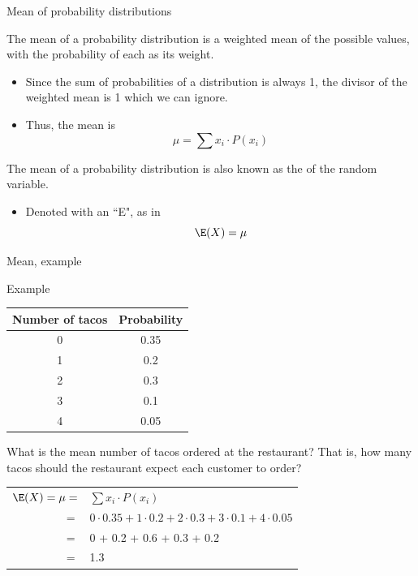 \documentclass[xcolor=table]{beamer}
\begin{document}
\begin{frame}{Mean of probability distributions}
\begin{block}{}
The mean of a probability distribution is a weighted mean of the possible values, with the probability of each as its weight. 
\begin{itemize}
\pause\item Since the sum of probabilities of a distribution is always 1, the divisor of the weighted mean is 1 which we can ignore.
\pause\item Thus, the mean is
\[\mu = \sum x_i \cdot P(x_i) \]
\end{itemize}
\medskip
\pause
The mean of a probability distribution is also known as the  of the random variable.
\begin{itemize}
\item Denoted with an ``E", as in 
\[\E(X) = \mu \]
\end{itemize}
\end{block}
\end{frame}

\begin{frame}{Mean, example}
\begin{exampleblock}{Example}
{\centering \renewcommand{\arraystretch}{1}
\begin{tabular}{c | c}
Number of tacos & Probability\\
\hline
0 & 0.35\\
1 & 0.2\\
2 & 0.3\\
3 & 0.1\\
4 & 0.05
\end{tabular}\par
\renewcommand{\arraystretch}{1.5}}
\bigskip

What is the mean number of tacos ordered at the restaurant? That is, how many tacos should the restaurant expect each customer to order?\\
\medskip
\pause
{\centering \renewcommand{\arraystretch}{1}
\begin{tabular}{r l}
$\E(X) = \mu =$ & $\sum x_i \cdot P(x_i)$\\
$=$ & $0 \cdot 0.35 + 1 \cdot 0.2 + 2 \cdot 0.3 + 3 \cdot 0.1 + 4 \cdot 0.05$\\
$=$ & 0 + 0.2 + 0.6 + 0.3 + 0.2\\
$=$ & 1.3
\end{tabular}\par
\renewcommand{\arraystretch}{1.5}}

\end{exampleblock}
\end{frame}
\end{document}
